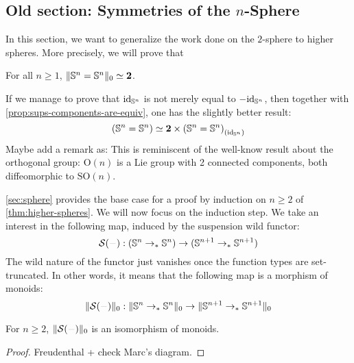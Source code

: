 \documentclass[english,a4]{article}
\newcommand{\ptdto}{\to_\ast}%
\newcommand{\setTrunc}[1]{\Trunc{#1}_0}
\begin{document}
\subsection{Old section: Symmetries of the $n$-Sphere}


In this section, we want to generalize the work done on the $2$-sphere to higher
spheres. More precisely, we will prove that
\begin{theorem}
    \label{thm:higher-spheres}
    For all $n\geq 1$, $\setTrunc{\Sn n = \Sn n} \weq \bn 2$.
\end{theorem}

If we manage to prove that $\mathord{\mathrm{id}}_{{\mathbb S^{n}}}$ is not merely equal to $-\mathord{\mathrm{id}}_{{\mathbb S^{n}}}$,
then together with \cref{prop:sups-components-are-equiv}, one has the slightly
better result:
\begin{displaymath}
({\mathbb S^{n}} = {\mathbb S^{n}}) \simeq \mathbf{2} \times {({\mathbb S^{n}} = {\mathbb S^{n}})}_{\left(\mathord{\mathrm{id}}_{{\mathbb S^{n}}}\right)}
\end{displaymath}
{\color{red} Maybe add a remark as: This is reminiscent of the well-know result
    about the orthogonal group: $\mathrm O(n)$ is a Lie group with 2 connected
    components, both diffeomorphic to $\mathrm{SO}(n)$.
}
%

\cref{sec:sphere} provides the base case for a proof by induction on $n \geq 2$
of \cref{thm:higher-spheres}. We will now focus on the induction step. 
%
We take an interest in the following map, induced by the suspension wild functor:
\begin{displaymath}
\susp (\blank) : (\Sn n \ptdto \Sn n) \to (\Sn {n+1} \ptdto \Sn{n+1})
\end{displaymath}
The wild nature of the functor just vanishes once the function types are
set-truncated.
%
In other words, it means that the following map is a morphism of monoids:
\begin{displaymath}
\setTrunc{\susp(\blank)} : \setTrunc{\Sn n \ptdto \Sn n} \to \setTrunc{\Sn {n+1} \ptdto \Sn{n+1}}
\end{displaymath}

\begin{proposition}
    For $n\geq 2$, $\setTrunc{\susp(\blank)}$ is an isomorphism of monoids.
    \label{prop:susp-iso-monoids}
\end{proposition}
\begin{proof}
    {\color{red}Freudenthal + check Marc's diagram.}
\end{proof}
\end{document}
